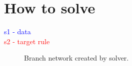 \documentclass[a4paper,11pt]{article}
\begin{document}
\section{How to solve}
\textcolor{blue}{s1 - data } \\
\textcolor{red}{s2 - target rule } 
    
    \begin{figure}[htbp]
            \vspace{-15pt} %
            \caption{Branch network created by solver.}
        \end{figure}
\end{document}
